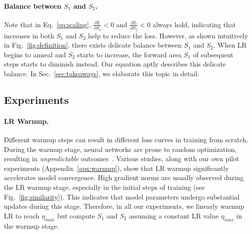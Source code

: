 \paragraph{Balance between $S_1$ and $S_2$.}
Note that in Eq.~\ref{eq:scaling}, $\frac{\partial L}{\partial S_1}<0$ and $\frac{\partial L}{\partial S_2}<0$ always hold, indicating that increases in both $S_1$ and $S_2$ help to reduce the loss.
However, as shown intuitively in Fig.~\ref{fig:definition}, there exists delicate balance between $S_1$ and $S_2$. When LR begins to anneal and $S_2$ starts to increase, the forward area $S_1$ of subsequent steps starts to diminish instead. 
Our equation aptly describes this delicate balance.
In Sec.~\ref{sec:takeaways}, we elaborate this topic in detail.
\subsection{Experiments}
\paragraph{LR Warmup.} Different warmup steps can result in different loss curves in training from scratch.
During the warmup stage, neural networks are prone to random optimization, resulting in \emph{unpredictable} outcomes~\citep{hestness2017deep}.
Various studies, along with our own pilot experiments (Appendix~\ref{apx:warmup}), show that LR warmup significantly accelerates model convergence.
High gradient norms are usually observed during the LR warmup stage, especially in the initial steps of training (see Fig.~\ref{fig:similarity}). This indicates that model parameters undergo substantial updates during this stage.
Therefore, in all our experiments, we linearly warmup LR to reach $\eta_{max}$ but compute $S_1$ and $S_2$ assuming a constant LR value $\eta_{max}$ in the warmup stage.

